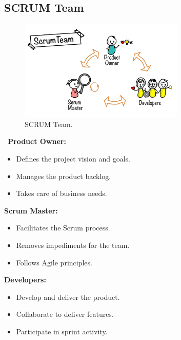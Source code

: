 \subsection{SCRUM Team}
\begin{figure}[h]
    \centering
    \includegraphics[width=0.7\textwidth]{figures/Scrum Team.png} 
    \caption{SCRUM Team.}
\end{figure} \ 
\textbf{Product Owner:}
\begin{itemize}
    \item Defines the project vision and goals.
    \item Manages the product backlog.
    \item Takes care of business needs.
\end{itemize}
\textbf{Scrum Master:}
\begin{itemize}
    \item Facilitates the Scrum process.
    \item Removes impediments for the team.
    \item Follows Agile principles.
\end{itemize}
\textbf{Developers:} 
\begin{itemize}
    \item Develop and deliver the product.
    \item Collaborate to deliver features.
    \item Participate in sprint activity.
\end{itemize}

